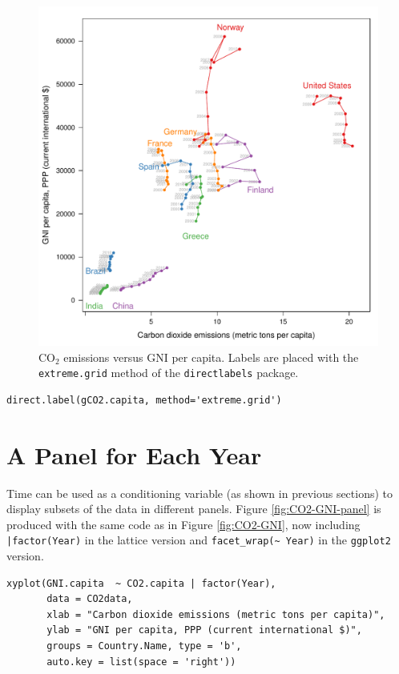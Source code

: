 \documentclass[smallroyalvopaper]{memoir}
\begin{document}
\begin{figure}[htbp]
\centering
\includegraphics[width=.9\linewidth]{figs/CO2_capitaDL.pdf}
\caption{\(\mathrm{CO_2}\) emissions versus GNI per capita. Labels are placed with the \texttt{extreme.grid} method of the \texttt{directlabels} package. \label{fig:CO2-GNI-DL}}
\end{figure}

\lstset{language=r,label= ,caption= ,captionpos=b,numbers=none}
\begin{lstlisting}
direct.label(gCO2.capita, method='extreme.grid')
\end{lstlisting}

\section{A Panel for Each Year}
\label{sec:orga81495a}
Time can be used as a conditioning variable (as shown in previous
sections) to display subsets of the data in different panels. Figure
\ref{fig:CO2-GNI-panel} is produced with the same code as in Figure
\ref{fig:CO2-GNI}, now including \texttt{|factor(Year)} in the lattice
version and \texttt{facet\_wrap(\textasciitilde{} Year)} in the \texttt{ggplot2} version.

\lstset{language=r,label= ,caption= ,captionpos=b,numbers=none}
\begin{lstlisting}
xyplot(GNI.capita  ~ CO2.capita | factor(Year),
       data = CO2data,
       xlab = "Carbon dioxide emissions (metric tons per capita)",
       ylab = "GNI per capita, PPP (current international $)",
       groups = Country.Name, type = 'b',
       auto.key = list(space = 'right'))
\end{lstlisting}
\end{document}
